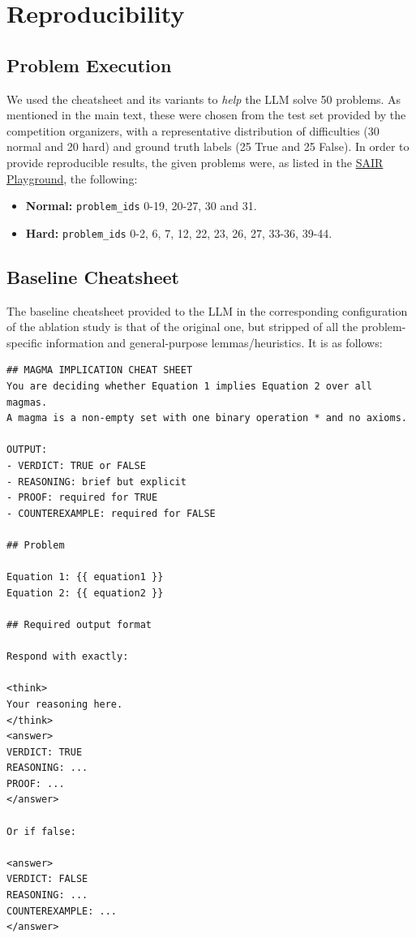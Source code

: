 \documentclass{article}
\begin{document}
\section{Reproducibility}

\subsection{Problem Execution}
\label{appendix:problem_execution}

We used the cheatsheet and its variants to \textit{help} the LLM solve 50 problems. As mentioned in the main text, these were chosen from the test set provided by the competition organizers, with a representative distribution of difficulties (30 normal and 20 hard) and ground truth labels (25 True and 25 False). In order to provide reproducible results, the given problems were, as listed in the \href{https://playground.sair.foundation/playground/mathematics-distillation-challenge-equational-theories-stage1}{SAIR Playground}, the following:
\begin{itemize}
  \item \textbf{Normal:} \texttt{problem\_ids} 0-19, 20-27, 30 and 31.
  \item \textbf{Hard:} \texttt{problem\_ids} 0-2, 6, 7, 12, 22, 23, 26, 27, 33-36, 39-44.
\end{itemize}

\subsection{Baseline Cheatsheet}
\label{appendix:baseline_cheatsheet}

The baseline cheatsheet provided to the LLM in the corresponding configuration of the ablation study is that of the original one, but stripped of all the problem-specific information and general-purpose lemmas/heuristics. It is as follows:
\begin{verbatim}
## MAGMA IMPLICATION CHEAT SHEET
You are deciding whether Equation 1 implies Equation 2 over all magmas.
A magma is a non-empty set with one binary operation * and no axioms.

OUTPUT:
- VERDICT: TRUE or FALSE
- REASONING: brief but explicit
- PROOF: required for TRUE
- COUNTEREXAMPLE: required for FALSE

## Problem

Equation 1: {{ equation1 }}
Equation 2: {{ equation2 }}

## Required output format

Respond with exactly:

<think>
Your reasoning here.
</think>
<answer>
VERDICT: TRUE
REASONING: ...
PROOF: ...
</answer>

Or if false:

<answer>
VERDICT: FALSE
REASONING: ...
COUNTEREXAMPLE: ...
</answer>
\end{verbatim}
\end{document}
